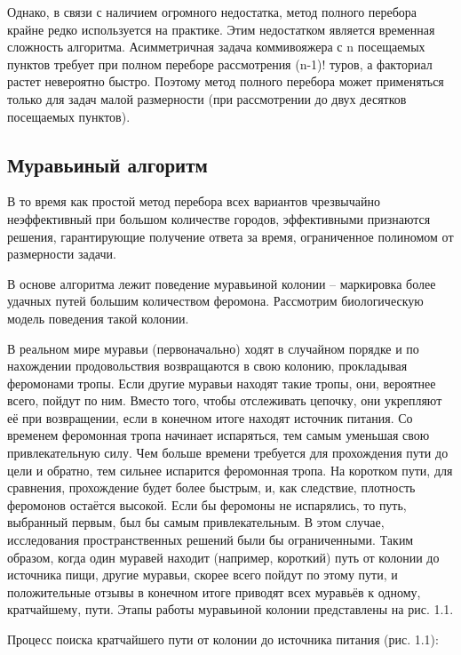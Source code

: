Однако, в связи с наличием огромного недостатка, метод полного
перебора крайне редко используется на практике. Этим недостатком является
временная сложность алгоритма. Асимметричная задача коммивояжера с n
посещаемых пунктов требует при полном переборе рассмотрения (n-1)! туров,
а факториал  растет невероятно быстро. Поэтому метод полного перебора может применяться только для задач
малой размерности (при рассмотрении до двух десятков посещаемых
пунктов).


\subsection{Муравьиный алгоритм}

В то время как простой метод перебора всех вариантов чрезвычайно
неэффективный при большом количестве городов,
эффективными признаются решения, гарантирующие получение
ответа за время, ограниченное полиномом от размерности задачи.

В основе алгоритма лежит поведение муравьиной колонии \cite{ulianov} -- маркировка более удачных
путей большим количеством феромона.
Рассмотрим биологическую модель поведения такой колонии.

В реальном мире муравьи (первоначально) ходят в случайном порядке и по нахождении
продовольствия возвращаются в свою колонию, прокладывая феромонами тропы.
Если другие муравьи находят такие тропы, они, вероятнее всего, пойдут по ним.
Вместо того, чтобы отслеживать цепочку, они укрепляют её при возвращении,
если в конечном итоге находят источник питания. Со временем феромонная тропа
начинает испаряться, тем самым уменьшая свою привлекательную силу. Чем больше
времени требуется для прохождения пути до цели и обратно, тем сильнее испарится
феромонная тропа. На коротком пути, для сравнения, прохождение будет более быстрым,
и, как следствие, плотность феромонов остаётся высокой.
Если бы феромоны не испарялись, то путь, выбранный первым,
был бы самым привлекательным. В этом случае, исследования пространственных
решений были бы ограниченными. Таким образом, когда один муравей находит
(например, короткий) путь от колонии до источника пищи, другие муравьи,
скорее всего пойдут по этому пути, и положительные отзывы в конечном итоге
приводят всех муравьёв к одному, кратчайшему, пути. Этапы работы муравьиной
колонии представлены на рис. 1.1.


Процесс поиска кратчайшего пути от колонии до источника питания (рис. 1.1):

